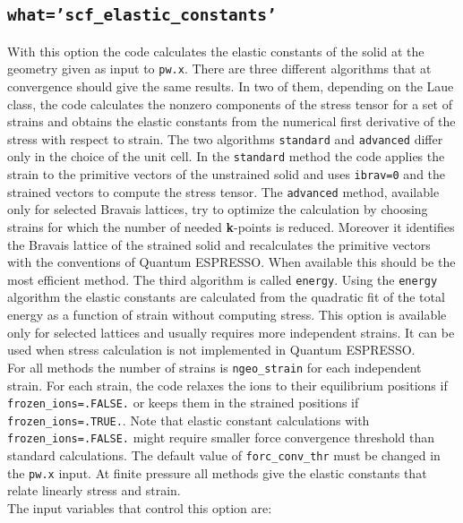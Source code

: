 \documentclass[12pt,a4paper]{article}
\def\qe{{\sc Quantum ESPRESSO}}
\begin{document}
\subsection{\color{web-blue}\texttt{what='scf\_elastic\_constants'}}
With this option the code calculates the elastic constants of the solid
at the geometry given as input to \texttt{pw.x}. 
There are three different algorithms that at convergence should give the
same results. In two of them, depending on the Laue class, the code 
calculates the nonzero components of the stress tensor for a set of strains
and obtains the elastic constants from the numerical first derivative
of the stress with respect to strain.
The two algorithms \texttt{standard} and \texttt{advanced} differ
only in the choice of the unit cell. In the \texttt{standard} method the
code applies the strain to the primitive vectors of the unstrained solid
and uses \texttt{ibrav=0} and the strained vectors to compute the stress
tensor.
The \texttt{advanced}  method, available only for selected Bravais lattices, 
try to optimize the calculation by choosing strains for which the number
of needed {\bf k}-points is reduced. Moreover it identifies the 
Bravais lattice of the strained solid and recalculates the primitive
vectors with the conventions of \qe. When available this should be the
most efficient method.
The third algorithm is called \texttt{energy}.
Using the \texttt{energy} algorithm the elastic constants are calculated 
from the quadratic fit of the total energy as a function of strain
without computing stress. This option is available only for selected 
lattices and usually requires more independent strains. It can be
used when stress calculation is not implemented in \qe.\\
For all methods the number of strains is \texttt{ngeo\_strain}
for each independent strain. 
For each strain, the code relaxes the ions to their equilibrium 
positions if \texttt{frozen\_ions=.FALSE.} or keeps them
in the strained positions if \texttt{frozen\_ions=.TRUE.}. 
Note that elastic constant calculations with \texttt{frozen\_ions=.FALSE.}
might require smaller force convergence threshold than standard calculations. 
The default value of \texttt{forc\_conv\_thr} must be changed in the 
\texttt{pw.x} input.
At finite pressure all methods give the elastic constants that
relate linearly stress and strain. \\
The input variables that control this option are:
\end{document}

